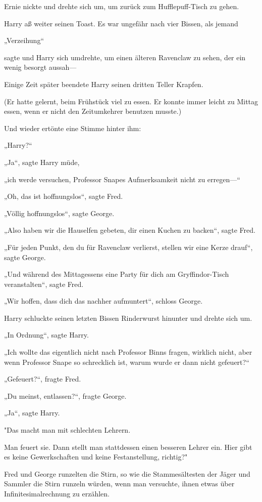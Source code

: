 {Ernie nickte und drehte sich um, um zurück zum Hufflepuff-Tisch zu gehen.

Harry aß weiter seinen Toast. Es war ungefähr nach vier Bissen, als jemand

„Verzeihung“

sagte und Harry sich umdrehte, um einen älteren Ravenclaw zu sehen, der ein wenig besorgt aussah—

Einige Zeit später beendete Harry seinen dritten Teller Krapfen.

(Er hatte gelernt, beim Frühstück viel zu essen. Er konnte immer leicht zu Mittag essen, wenn er nicht den Zeitumkehrer benutzen musste.)

Und wieder ertönte eine Stimme hinter ihm:

„Harry?“

„Ja“, sagte Harry müde,

„ich werde versuchen, Professor Snapes Aufmerksamkeit nicht zu erregen—“

„Oh, das ist hoffnungslos“, sagte Fred.

„Völlig hoffnungslos“, sagte George.

„Also haben wir die Hauselfen gebeten, dir einen Kuchen zu backen“, sagte Fred.

„Für jeden Punkt, den du für Ravenclaw verlierst, stellen wir eine Kerze drauf“, sagte George.

„Und während des Mittagessens eine Party für dich am Gryffindor-Tisch veranstalten“, sagte Fred.

„Wir hoffen, dass dich das nachher aufmuntert“, schloss George.

Harry schluckte seinen letzten Bissen Rinderwurst hinunter und drehte sich um.

„In Ordnung“, sagte Harry.

„Ich wollte das eigentlich nicht nach Professor Binns fragen, wirklich nicht, aber wenn Professor Snape so schrecklich ist, warum wurde er dann nicht gefeuert?“

„Gefeuert?“, fragte Fred.

„Du meinst, entlassen?“, fragte George.

„Ja“, sagte Harry.

"Das macht man mit schlechten Lehrern.

Man feuert sie. Dann stellt man stattdessen einen besseren Lehrer ein. Hier gibt es keine Gewerkschaften und keine Festanstellung, richtig?"

Fred und George runzelten die Stirn, so wie die Stammesältesten der Jäger und Sammler die Stirn runzeln würden, wenn man versuchte, ihnen etwas über Infinitesimalrechnung zu erzählen.

}
